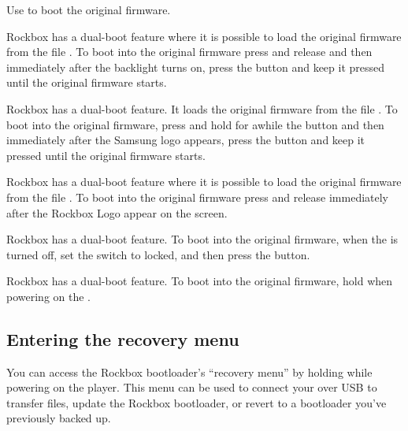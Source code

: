 {  
    {
    Use \ButtonPower{} to boot the original \playerman{} firmware.
    }

    {
    Rockbox has a dual-boot feature where it is possible to load the original firmware from
    the file . To boot into the original firmware press and release
    \ButtonPower{} and then immediately after the backlight turns on, press the \ButtonOK{}
    button and keep it pressed until the original firmware starts.
    }

    {
    Rockbox has a dual-boot feature. It loads the original firmware from
    the file . To boot into the original firmware, press and hold
    for awhile the \ButtonPlay{} button and then immediately after the Samsung logo appears,
    press the \ButtonLeft{} button and keep it pressed until the original firmware starts.
    }

    {
    Rockbox has a dual-boot feature where it is possible to load the original firmware from
    the file . To boot into the original firmware press and release
    \ButtonPower{} immediately after the Rockbox Logo appear on the screen.
    }

    {
    Rockbox has a dual-boot feature. To boot into the original firmware,
    when the \dap{} is turned off, set the \ButtonLock{} switch to locked,
    and then press the \ButtonPower{} button.
    }

    {
    Rockbox has a dual-boot feature. To boot into the original firmware,
    hold \ActionBootOFPlayer{} when powering on the \dap{}.


    \subsection{Entering the recovery menu}
    You can access the Rockbox bootloader's ``recovery menu'' by holding
    \ActionBootRecoveryMenu{} while powering on the player. This menu can be
    used to connect your \dap{} over USB to transfer files, update the Rockbox
    bootloader, or revert to a bootloader you've previously backed up.
    }

  }
